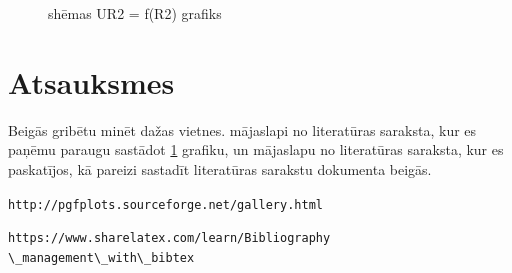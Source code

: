 \documentclass{report}
\begin{document}
\begin{figure}[h!] 
\begin{center}
\caption{shēmas UR2 = f(R2) grafiks}
\label{fig:graf}
\end{center}
\end{figure}


\chapter{Atsauksmes}
Beigās gribētu minēt dažas vietnes. \cite{plots} mājaslapi no literatūras saraksta, kur es paņēmu paraugu sastādot \ref{fig:graf} grafiku, un \cite{bibly} mājaslapu no literatūras saraksta, kur es paskatījos, kā pareizi sastadīt literatūras sarakstu dokumenta beigās.


\begin{thebibliography}{9}
\texttt{http://pgfplots.sourceforge.net/gallery.html}

\texttt{https://www.sharelatex.com/learn/Bibliography\\\textbackslash\_management\textbackslash\_with\textbackslash\_bibtex}

\end{thebibliography}
\end{document}
